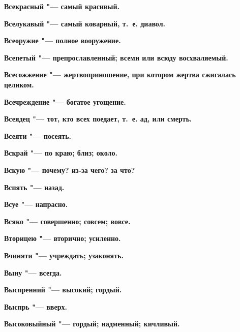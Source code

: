 \begin{mymulticols}{2}
\bfseries Всекрасный\normalfont{} "--- самый красивый. 




\bfseries Вселукавый\normalfont{} "--- самый коварный, т.~е. диавол. 




\bfseries Всеоружие\normalfont{} "--- полное вооружение. 




\bfseries Всепетый\normalfont{} "--- препрославленный; всеми или всюду восхваляемый. 




\bfseries Всесожжение\normalfont{} "--- жертвоприношение, при котором жертва сжигалась целиком. 




\bfseries Всечреждение\normalfont{} "--- богатое угощение. 




\bfseries Всеядец\normalfont{} "--- тот, кто всех поедает, т.~е. ад, или смерть. 




\bfseries Всеяти\normalfont{} "--- посеять. 




\bfseries Вскрай\normalfont{} "--- по краю; близ; около. 




\bfseries Вскую\normalfont{} "--- почему? из-за чего? за что? 




\bfseries Вспять\normalfont{} "--- назад. 




\bfseries Всуе\normalfont{} "--- напрасно. 




\bfseries Всяко\normalfont{} "--- совершенно; совсем; вовсе. 




\bfseries Вторицею\normalfont{} "--- вторично; усиленно. 




\bfseries Вчиняти\normalfont{} "--- учреждать; узаконять. 




\bfseries Выну\normalfont{} "--- всегда. 




\bfseries Выспренний\normalfont{} "--- высокий; гордый. 




\bfseries Выспрь\normalfont{} "--- вверх. 




\bfseries Высоковыйный\normalfont{} "--- гордый; надменный; кичливый. 





\end{mymulticols}
